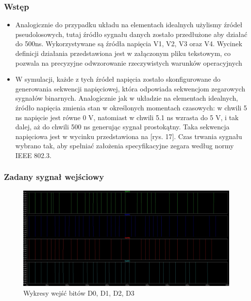 \documentclass{article}
\begin{document}
\subsubsection{Wstęp}
\begin{itemize}
    \item Analogicznie do przypadku układu na elementach idealnych użylismy źródeł pseudolosowych, tutaj źródło sygnału danych zostało przedłużone aby działać do 500ns. Wykorzystywane są źródła napięcia V1, V2, V3 oraz V4. 
    Wycinek definicji działania przedstawiona jest w załączonym pliku
    tekstowym, co pozwala na precyzyjne odwzorowanie rzeczywistych warunków operacyjnych
    \item W symulacji, każde z tych źródeł napięcia zostało skonfigurowane do generowania sekwencji napięciowej, która odpowiada sekwencjom zegarowych sygnałów binarnych. Analogicznie jak w układzie na elementach idealnych, źródło napięcia zmienia stan w  określonych momentach czasowych: w chwili 5 ns napięcie jest równe 0 V, natomiast w chwili 5.1 ns wzrasta do 5 V, i tak dalej, aż do chwili 500 ns generując sygnał prostokątny. Taka sekwencja napięciowa jest w wycinku przedstawiona na [rys. 17]. Czas trwania sygnału wybrano tak, aby spełniać założenia specyfikacyjne zegara według normy IEEE 802.3. \cite{ieee802}
\end{itemize} 

\subsubsection{Zadany sygnał wejściowy}
\begin{figure}[ht]
    \centering
    \begin{adjustbox}{center}
        \includegraphics[width=1.4\textwidth]{wejsciowe-rzecz.jpg}
    \end{adjustbox}
    \caption{Wykresy wejść bitów D0, D1, D2, D3}
    \label{fig:mojobrazek}
\end{figure}
\end{document}
